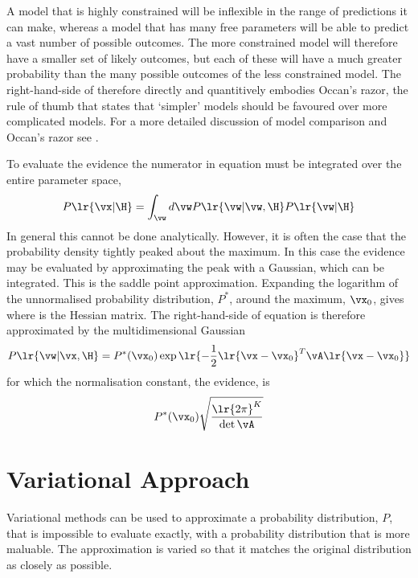 {A model that is highly constrained will be inflexible in the range of predictions it can make,
whereas a model that has many free parameters will be able to predict a vast number of possible outcomes.
The more constrained model will therefore have a smaller set of likely outcomes,
but each of these will have a much greater probability than the many possible outcomes of the less constrained model.
The right-hand-side of  therefore directly and quantitively embodies Occan's razor,
the rule of thumb that states that `simpler' models should be favoured over more complicated models.
For a more detailed discussion of model comparison and Occan's razor see \cite[Chapter 28]{Mackay2003}.

To evaluate the evidence the numerator in equation  must be integrated over the entire parameter space,
\begin{align}
  P\lr{\vx|\H} = \int_\vw d\vw P\lr{\vw|\vw,\H} P\lr{\vw|\H}
\end{align}
In general this cannot be done analytically.
However, it is often the case that the probability density tightly peaked about the maximum.
In this case the evidence may be evaluated by approximating the peak with a Gaussian, which can be integrated.
This is the saddle point approximation.
Expanding the logarithm of the  unnormalised probability distribution, $P^\ast$, 
around the maximum, $\vx_0$,
gives
where 
is the Hessian matrix.
The right-hand-side of equation   is therefore approximated by the multidimensional Gaussian
\begin{align}
   P\lr{\vw|\vx,\H} = P^\ast(\vx_0) \exp \lr{- \frac{1}{2}\lr{\vx-\vx_0}^T \vA\lr{\vx-\vx_0 }}
\end{align}
for which the normalisation constant, the evidence, is 
\begin{align}
   P^\ast(\vx_0) \sqrt{\frac{\lr{2\pi}^K}{\det \vA}}
\end{align}

\section{Variational Approach}

Variational methods can be used to approximate a probability distribution, $P$, that is impossible to evaluate exactly, 
with a probability distribution that is more maluable.
The approximation is varied so that it matches the original distribution as closely as possible. 

}

